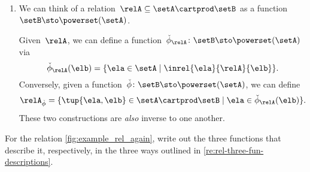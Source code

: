 \begin{remark}
\begin{enumerate}
        \item We can think of a relation~$\relA \subseteq \setA \cartprod \setB$ as a function~$\setB  \sto \powerset (\setA)$.

        Given~$\relA$, we can define a function~$\check \phi_{\relA} \colon \setB \sto \powerset (\setA)$ via
        \begin{equation}
            \check \phi_{\relA} (\elb) = \{ \ela \in \setA \mid \inrel{\ela}{\relA}{\elb}\}.
        \end{equation}
        Conversely, given a function~$\check \phi \colon \setB \sto \powerset (\setA)$, we can define
        \begin{equation}
            \relA_{\check \phi} = \{ \tup{\ela, \elb} \in \setA \cartprod \setB \mid \ela \in \check \phi_{\relA}(\elb)\}.
        \end{equation}
        These two constructions are \emph{also} inverse to one another.
    \end{enumerate}
\end{remark}

\begin{gradedexercise}
    \label{ex:Rel3Functions}
    For the relation \cref{fig:example_rel_again},
    write out the three functions that describe it, respectively, in the three ways outlined in \cref{re:rel-three-fun-descriptions}.
\end{gradedexercise}
\begin{marginfigure}
    \centering
    \caption{}
    \label{fig:example_rel_again}
\end{marginfigure}

